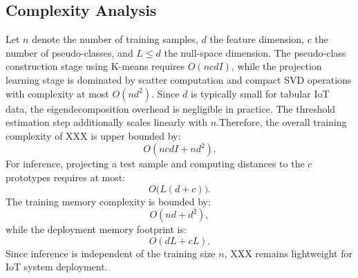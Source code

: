 \documentclass[final,twocolumn,10pt]{elsarticle}
\begin{document}



\subsection{Complexity Analysis}
\label{subsec:complexity_XXX_revised}

Let \(n\) denote the number of training samples, \(d\) the feature dimension, \(c\) the number of pseudo-classes, and \(L \le d\) the null-space dimension. The pseudo-class construction stage using K-means requires \(O(ncdI)\), while the projection learning stage is dominated by scatter computation and compact SVD operations with complexity at most \(O(nd^2)\). Since \(d\) is typically small for tabular IoT data, the eigendecomposition overhead is negligible in practice. The threshold estimation step additionally scales linearly with \(n\).Therefore, the overall training complexity of XXX is upper bounded by:
\begin{equation}
O(ncdI + nd^2).
\label{eq:complexity_train_XXX_revised}
\end{equation}
For inference, projecting a test sample and computing distances to the \(c\) prototypes requires at most:
\begin{equation}
O\big(L(d+c)\big).
\label{eq:complexity_test_XXX_revised}
\end{equation}
The training memory complexity is bounded by:
\begin{equation}
O(nd+d^2),
\label{eq:complexity_memory_train_XXX}
\end{equation}
while the deployment memory footprint is:
\begin{equation}
O(dL+cL).
\label{eq:complexity_memory_test_XXX}
\end{equation}
Since inference is independent of the training size \(n\), XXX remains lightweight for IoT system deployment.
\end{document}
